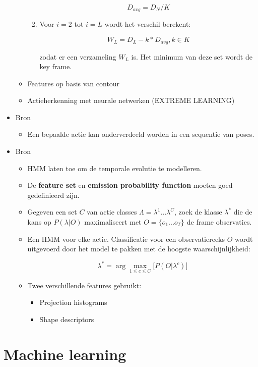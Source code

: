 \begin{itemize}
\begin{itemize}
\begin{enumerate}
			$$D_{avg} = D_N / K$$
			
			\item Voor $i = 2$ tot $i = L$ wordt het verschil berekent:
			
			$$W_L = D_L - k * D_{avg}, k \in K$$
			
			zodat er een verzameling ${W_L}$ is. Het minimum van deze set wordt de key frame.
		\end{enumerate}
		\item Features op basis van contour
		\item Actieherkenning met neurale netwerken (EXTREME LEARNING)
	\end{itemize}

	\item Bron \cite{Carlsson2001}
	\begin{itemize}
		\item Een bepaalde actie kan onderverdeeld worden in een sequentie van poses.
	\end{itemize}	

	\item Bron \cite{Vezzani2010}
	\begin{itemize}
		\item HMM laten toe om de temporale evolutie te modelleren.
		\item De \textbf{feature set} en \textbf{emission probability function} moeten goed gedefinieerd zijn. 
		\item Gegeven een set $C$ van actie classes $\Lambda = \lambda^1 ... \lambda^C$, zoek de klasse $\lambda^*$ die de kans op $P(\lambda|O)$ maximaliseert met $O = \{o_1 ... o_T\}$ de frame observaties.
		\item Een HMM voor elke actie. Classificatie voor een observatiereeks $O$ wordt uitgevoerd door het model te pakken met de hoogste waarschijnlijkheid:
		
				
		$$\lambda^* = \arg \max_{1\leq c\leq C} \big[P(O|\lambda^c)\big]$$
		\item Twee verschillende features gebruikt:
		\begin{itemize}
			\item Projection histograms
			\item Shape descriptors
		\end{itemize}
	\end{itemize}
\end{itemize}



\chapter{Machine learning}
